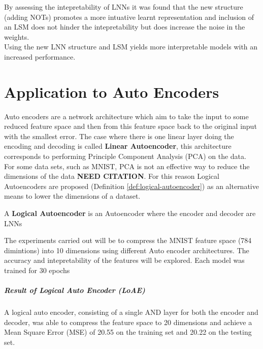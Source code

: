 By assessing the intepretability of LNNs it was found that the new structure (adding NOTs) promotes a more intuative learnt representation and inclusion of an LSM does not hinder the intepretability but does increase the noise in the weights.\\

Using the new LNN structure and LSM yields more interpretable models with an increased performance.

\chapter{Application to Auto Encoders} \label{C:lnn-application}
Auto encoders \cite{baldi2012complex} are a network architecture which aim to take the input to some reduced feature space and then from this feature space back to the original input with the smallest error. The case where there is one linear layer doing the encoding and decoding is called \textbf{Linear Autoencoder}, this architecture corresponds to performing Principle Component Analysis (PCA) on the data.\\

For some data sets, such as MNIST, PCA is not an effective way to reduce the dimensions of the data \textbf{NEED CITATION}. For this reason Logical Autoencoders are proposed (Definition \ref{def:logical-autoencoder}) as an alternative means to lower the dimensions of a dataset.

\begin{definition} \label{def:logical-autoencoder}
	A \textbf{Logical Autoencoder} is an Autoencoder where the encoder and decoder are LNNs
\end{definition}

The experiments carried out will be to compress the MNIST feature space (784 dimintions) into 10 dimensions using different Auto encoder architectures. The accuracy and intepretability of the features will be explored. Each model was trained for 30 epochs

\paragraph{Result of Logical Auto Encoder (LoAE)}
A logical auto encoder, consisting of a single AND layer for both the encoder and decoder, was able to compress the feature space to 20 dimensions and achieve a Mean Square Error (MSE) of 20.55 on the training set and 20.22 on the testing set.

